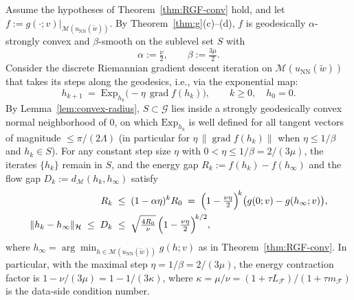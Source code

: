 \documentclass[twoside,11pt]{article}
\newcommand{\Exp}{\mathrm{Exp}}
\newcommand{\grad}{\operatorname{grad} }
\newcommand{\NN}{\mathrm{NN}}
\newcommand{\calF}{\mathcal{F}}
\newcommand{\calG}{\mathcal{G}}
\newcommand{\calH}{\mathcal{H}}
\newcommand{\calM}{\mathcal{M}}
\begin{document}
\begin{theorem}\label{thm:discrete-RGD}
Assume the hypotheses of Theorem~\ref{thm:RGF-conv} hold, and let $f := g(\cdot; v)|_{\calM(u_\NN(\tilde w))}$. By Theorem~\ref{thm:g}(c)--(d), $f$ is geodesically $\alpha$-strongly convex and $\beta$-smooth on the sublevel set $S$ with
\[
\alpha := \tfrac{\nu}{2},\qquad \beta := \tfrac{3\mu}{2}.
\]
Consider the discrete Riemannian gradient descent iteration on $\calM(u_\NN(\tilde w))$ that takes its steps along the geodesics, i.e., via the exponential map:
\begin{equation}\label{eq:discrete-RGD}
    h_{k+1} \;=\; \Exp_{h_k}\bigl(-\eta\,\grad f(h_k)\bigr),\qquad k\ge 0,\quad h_0 = 0.
\end{equation}
By Lemma~\ref{lem:convex-radius}, $S\subset\calG$ lies inside a strongly geodesically convex normal neighborhood of $0$, on which $\Exp_{h_k}$ is well defined for all tangent vectors of magnitude $\le\pi/(2\Lambda)$ (in particular for $\eta\,\|\grad f(h_k)\|$ when $\eta\le 1/\beta$ and $h_k\in S$).
For any constant step size $\eta$ with $0 < \eta \le 1/\beta = 2/(3\mu)$, the iterates $\{h_k\}$ remain in $S$, and the energy gap $R_k := f(h_k) - f(h_\infty)$ and the flow gap $D_k := d_\calM(h_k, h_\infty)$ satisfy
\begin{align}
    R_k \;&\le\; (1 - \alpha\eta)^k R_0
    \;=\; \Bigl(1 - \tfrac{\nu\eta}{2}\Bigr)^{\!k}\bigl(g(0;v) - g(h_\infty;v)\bigr), \label{eq:discrete-RGD-bound} \\
    \|h_k - h_\infty\|_\calH \;\le\; D_k \;&\le\; \sqrt{\tfrac{4 R_0}{\nu}}\,\Bigl(1-\tfrac{\nu\eta}{2}\Bigr)^{\!k/2}, \label{eq:discrete-RGD-flow-gap}
\end{align}
where $h_\infty = \arg\min_{h\in\calM(u_\NN(\tilde w))} g(h;v)$ as in Theorem~\ref{thm:RGF-conv}.
In particular, with the maximal step $\eta = 1/\beta = 2/(3\mu)$, the energy contraction factor is $1 - \nu/(3\mu) = 1 - 1/(3\kappa)$, where $\kappa = \mu/\nu = (1+\tau L_\calF)/(1+\tau m_\calF)$ is the data-side condition number.
\end{theorem}
\end{document}
